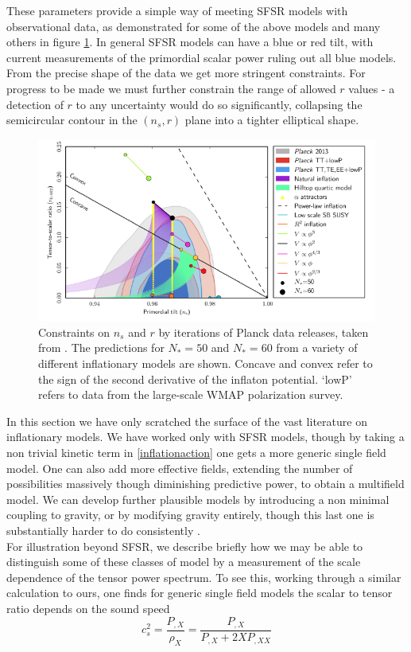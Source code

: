 \documentclass[a4paper,10pt]{article}
\begin{document}
These parameters provide a simple way of meeting SFSR models with observational data, as demonstrated for some of the above models and many others in figure \ref{inflationconstraints}. In general SFSR models can have a blue or red tilt, with current measurements of the primordial scalar power ruling out all blue models. From the precise shape of the data we get more stringent constraints. For progress to be made we must further constrain the range of allowed $r$ values - a detection of $r$ to any uncertainty would do so significantly, collapsing the semicircular contour in the $(n_s,r)$ plane into a tighter elliptical shape.

\begin{figure}[h]
  \includegraphics[width=0.7\linewidth]{modeldepconstraints.png}
  \centering
  \caption{Constraints on $n_s$ and $r$ by iterations of Planck data releases, taken from \cite{QBM}. The predictions for $N_*=50$ and $N_*=60$ from a variety of different inflationary models are shown. Concave and convex refer to the sign of the second derivative of the inflaton potential. `lowP' refers to data from the large-scale WMAP polarization survey.}
\label{inflationconstraints}  
\end{figure}


In this section we have only scratched the surface of the vast literature on inflationary models. We have worked only with SFSR models, though by taking a non trivial kinetic term in \ref{inflationaction} one gets a more generic single field model. One can also add more effective fields, extending the number of possibilities massively though diminishing predictive power, to obtain a multifield model. We can develop further plausible models by introducing a non minimal coupling to gravity, or by modifying gravity entirely, though this last one is substantially harder to do consistently \cite{baumannTASILecturesInflation2012}.\\

For illustration beyond SFSR, we describe briefly how we may be able to distinguish some of these classes of model by a measurement of the scale dependence of the tensor power spectrum. To see this, working through a similar calculation to ours, one finds for generic single field models the scalar to tensor ratio depends on the sound speed \cite{CMBPol}
\begin{equation}
c_s^2 = \frac{P_{,X}}{\rho_X} = \frac{P_{,X}}{P_{,X}+2XP_{,XX}}
\end{equation}
\end{document}
